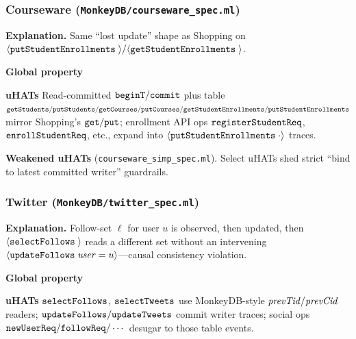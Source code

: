 \subsubsection*{Courseware (\texttt{MonkeyDB/courseware\_spec.ml})}
\textbf{Explanation.}
Same ``lost update'' shape as Shopping on \({\langle} {\boldsymbol{{\tt putStudentEnrollments}}\;{}} {\rangle}/{\langle} {\boldsymbol{{\tt getStudentEnrollments}}\;{}} {\rangle}\).

\textbf{Global property}
\vspace{-.35cm}\par{}
\vspace{-.4cm}\par\nobreak\noindent
\textbf{uHATs}
Read-committed \(\boldsymbol{{\tt beginT}}/\boldsymbol{{\tt commit}}\) plus table \(\boldsymbol{{\tt getStudents}}/\boldsymbol{{\tt putStudents}}/\boldsymbol{{\tt getCourses}}/\boldsymbol{{\tt putCourses}}/\boldsymbol{{\tt getStudentEnrollments}}/\boldsymbol{{\tt putStudentEnrollments}}\) mirror Shopping's \(\boldsymbol{{\tt get}}/\boldsymbol{{\tt put}}\); enrollment API ops \(\boldsymbol{{\tt registerStudentReq}}\), \(\boldsymbol{{\tt enrollStudentReq}}\), etc., expand into \({\langle} {\boldsymbol{{\tt putStudentEnrollments}}\;{\cdot}} {\rangle}\) traces.

\textbf{Weakened uHATs} (\texttt{courseware\_simp\_spec.ml}).
Select uHATs shed strict ``bind to latest committed writer'' guardrails.

\subsubsection*{Twitter (\texttt{MonkeyDB/twitter\_spec.ml})}
\textbf{Explanation.}
Follow-set \(\ell\) for user \(u\) is observed, then updated, then \({\langle} {\boldsymbol{{\tt selectFollows}}\;{}} {\rangle}\) reads a different set without an intervening \({\langle} {\boldsymbol{{\tt updateFollows}}\;{\mathit{user}=u}} {\rangle}\)---causal consistency violation.

\textbf{Global property}
\vspace{-.35cm}\par{}
\vspace{-.4cm}\par\nobreak\noindent
\textbf{uHATs}
\(\boldsymbol{{\tt selectFollows}}\), \(\boldsymbol{{\tt selectTweets}}\) use MonkeyDB-style \(\mathit{prevTid}/\mathit{prevCid}\) readers; \(\boldsymbol{{\tt updateFollows}}/\boldsymbol{{\tt updateTweets}}\) commit writer traces; social ops \(\boldsymbol{{\tt newUserReq}}/\boldsymbol{{\tt followReq}}/\cdots\) desugar to those table events.


